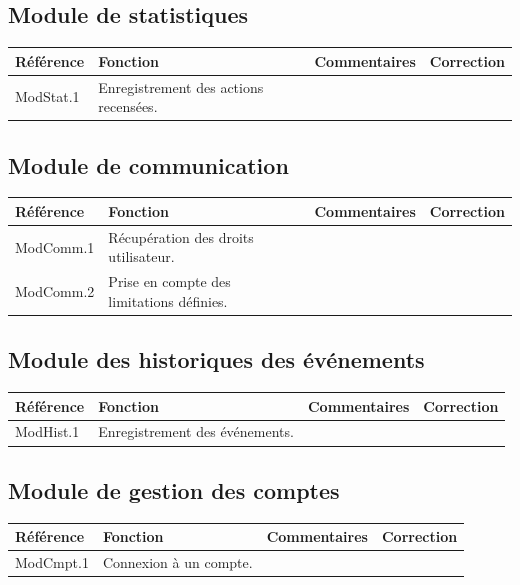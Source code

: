 \documentclass[10pt,a4paper,landscape]{report}
\begin{document}
\subsection{Module de statistiques}

\begin{center}
	\bgroup
	\def\arraystretch{1.5}
	\begin{tabular}{|p{2.5cm}|p{8cm}|p{8cm}|p{8cm}|}
		\hline
		\rowcolor{gris}Référence & Fonction & Commentaires & Correction\\
		\hline
		ModStat.1 & Enregistrement des actions recensées. & & \\
		\hline
	\end{tabular}
	\egroup
\end{center}


\subsection{Module de communication}

\begin{center}
	\bgroup
	\def\arraystretch{1.5}
	\begin{tabular}{|p{2.5cm}|p{8cm}|p{8cm}|p{8cm}|}
		\hline
		\rowcolor{gris}Référence & Fonction & Commentaires & Correction\\
		\hline
		ModComm.1 & Récupération des droits utilisateur. & & \\
		\hline
		ModComm.2 & Prise en compte des limitations définies. & & \\
		\hline
	\end{tabular}
	\egroup
\end{center}


\subsection{Module des historiques des événements}

\begin{center}
	\bgroup
	\def\arraystretch{1.5}
	\begin{tabular}{|p{2.5cm}|p{8cm}|p{8cm}|p{8cm}|}
		\hline
		\rowcolor{gris}Référence & Fonction & Commentaires & Correction\\
		\hline
		ModHist.1 & Enregistrement des événements. & & \\
		\hline
	\end{tabular}
	\egroup
\end{center}


\subsection{Module de gestion des comptes}

\begin{center}
	\bgroup
	\def\arraystretch{1.5}
	\begin{tabular}{|p{2.5cm}|p{8cm}|p{8cm}|p{8cm}|}
		\hline
		\rowcolor{gris}Référence & Fonction & Commentaires & Correction\\
		\hline
		ModCmpt.1 & Connexion à un compte. & & \\
		\hline
	\end{tabular}
	\egroup
\end{center}
\end{document}
